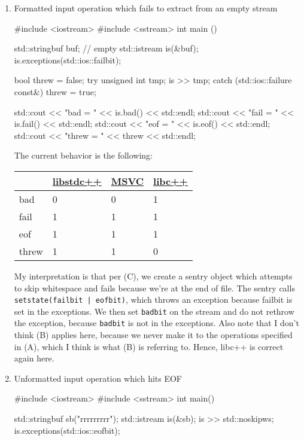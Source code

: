 \documentclass{wg21}
\newcommand{\cc}[1]{\texttt{#1}}
\begin{document}
\begin{enumerate}
  \item Formatted input operation which fails to extract from an empty stream
  \begin{cpp}
  #include <iostream>
  #include <sstream>
  int main () {
      std::stringbuf buf; // empty
      std::istream is(&buf);
      is.exceptions(std::ios::failbit);

      bool threw = false;
      try {
          unsigned int tmp{};
          is >> tmp;
      } catch (std::ios::failure const&) {
          threw = true;
      }

      std::cout << "bad = " << is.bad() << std::endl;
      std::cout << "fail = " << is.fail() << std::endl;
      std::cout << "eof = " << is.eof() << std::endl;
      std::cout << "threw = " << threw << std::endl;
  }
  \end{cpp}

  The current behavior is the following:
  \begin{center}
  \begin{tabular}{| l | l | l | l |}
  \hline
         & \href{https://wandbox.org/permlink/UpOSzH76Ovm4RzTz}{libstdc++}
         & \href{http://rextester.com/WBRK78783}{MSVC}
         & \href{https://wandbox.org/permlink/aL4Xl2d8VKVK2EY2}{libc++} \\ \hline
  bad    & 0         & 0    & 1      \\ \hline
  fail   & 1         & 1    & 1      \\ \hline
  eof    & 1         & 1    & 1      \\ \hline
  threw  & 1         & 1    & 0      \\ \hline
  \end{tabular}
  \end{center}

  My interpretation is that per (C), we create a sentry object which attempts to skip whitespace and fails because we're at the end of file. The sentry calls \cc{setstate(failbit | eofbit)}, which throws an exception because failbit is set in the exceptions. We then set \cc{badbit} on the stream and do not rethrow the exception, because \cc{badbit} is not in the exceptions. Also note that I don't think (B) applies here, because we never make it to the operations specified in (A), which I think is what (B) is referring to. Hence, libc++ is correct again here.

  \item Unformatted input operation which hits EOF
  \begin{cpp}
  #include <iostream>
  #include <sstream>
  int main() {
      std::stringbuf sb("rrrrrrrrr");
      std::istream is(&sb);
      is >> std::noskipws;
      is.exceptions(std::ios::eofbit);

}
\end{cpp}
\end{enumerate}
\end{document}
